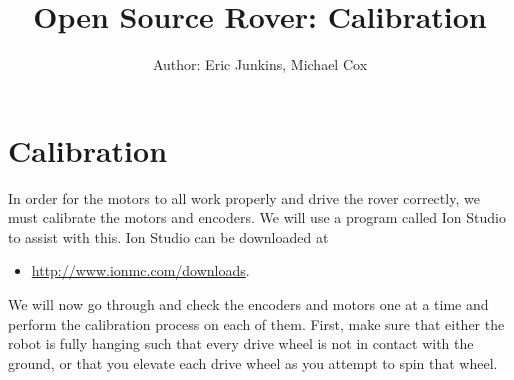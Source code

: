 \documentclass[12pt]{article}
\begin{document}
\title{Open Source Rover: Calibration}
\author{Author: Eric Junkins, Michael Cox}

\makeatletter         
\def\@maketitle{
\begin{center}	
	\makebox[\textwidth][c]{ \texttt{[image: "Pictures/calibration".png]}}
	{\Huge \bfseries \sffamily \@title }\\[3ex] 
	{\Large \sffamily \@author}\\[3ex] 
	\texttt{[image: "Pictures/JPL logo".png]}
\end{center}}
\makeatother

\maketitle


\newpage


\tableofcontents




\section{Calibration}
\label{cal section}
In order for the motors to all work properly and drive the rover correctly, we must calibrate the motors and encoders. We will use a program called Ion Studio to assist with this. Ion Studio can be downloaded at 
\begin{itemize}
	\item \href{http://www.ionmc.com/downloads}{http://www.ionmc.com/downloads}. 
\end{itemize}

\noindent We will now go through and check the encoders and motors one at a time and perform the calibration process on each of them. First, make sure that either the robot is fully hanging such that every drive wheel is not in contact with the ground, or that you elevate each drive wheel as you attempt to spin that wheel.
\end{document}
